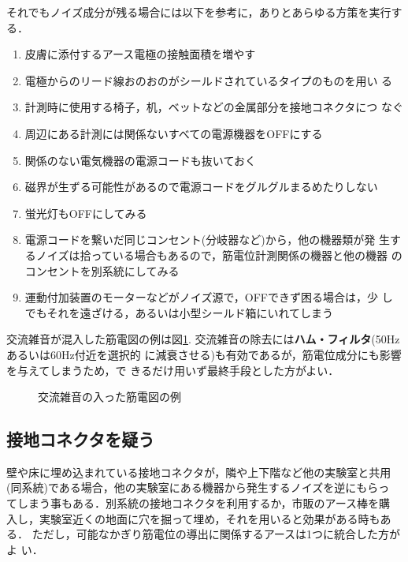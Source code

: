 \documentclass[10pt,twocolumn]{jarticle}
\begin{document}
それでもノイズ成分が残る場合には以下を参考に，ありとあらゆる方策を実行す
る．
\begin{enumerate}
\item 皮膚に添付するアース電極の接触面積を増やす
\item 電極からのリード線おのおのがシールドされているタイプのものを用い
  る
\item 計測時に使用する椅子，机，ベットなどの金属部分を接地コネクタにつ
  なぐ
\item 周辺にある計測には関係ないすべての電源機器をOFFにする
\item 関係のない電気機器の電源コードも抜いておく
\item 磁界が生ずる可能性があるので電源コードをグルグルまるめたりしない
\item 蛍光灯もOFFにしてみる
\item 電源コードを繋いだ同じコンセント(分岐器など)から，他の機器類が発
生するノイズは拾っている場合もあるので，筋電位計測関係の機器と他の機器
のコンセントを別系統にしてみる
\item 運動付加装置のモーターなどがノイズ源で，OFFできず困る場合は，少
  しでもそれを遠ざける，あるいは小型シールド箱にいれてしまう
\end{enumerate}

交流雑音が混入した筋電図の例は図\ref{fig:2-13}. 
交流雑音の除去には{\bf ハム・フィルタ}(50Hzあるいは60Hz付近を選択的
に減衰させる)も有効であるが，筋電位成分にも影響を与えてしまうため，で
きるだけ用いず最終手段とした方がよい．

\begin{figure}[h]
  \centering
  \caption{交流雑音の入った筋電図の例\label{fig:2-13}}
 \end{figure}

\subsection{接地コネクタを疑う}
壁や床に埋め込まれている接地コネクタが，隣や上下階など他の実験室と共用
(同系統)である場合，他の実験室にある機器から発生するノイズを逆にもらっ
てしまう事もある．別系統の接地コネクタを利用するか，市販のアース棒を購
入し，実験室近くの地面に穴を掘って埋め，それを用いると効果がある時もあ
る．
ただし，可能なかぎり筋電位の導出に関係するアースは1つに統合した方がよ
い．
\end{document}
